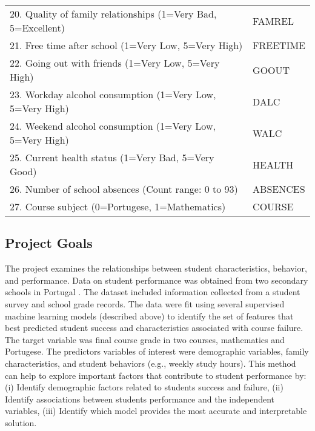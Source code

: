 \documentclass[sigconf]{acmart}
\begin{document}
\begin{table*}[ht]
\begin{tabular}{ll}
    20. Quality of family relationships (1=Very Bad, 5=Excellent) & FAMREL  \\
    21. Free time after school (1=Very Low, 5=Very High) & FREETIME  \\
    22. Going out with friends (1=Very Low, 5=Very High) & GOOUT  \\
    23. Workday alcohol consumption (1=Very Low, 5=Very High) & DALC  \\
    24. Weekend alcohol consumption (1=Very Low, 5=Very High) & WALC  \\
    25. Current health status (1=Very Bad, 5=Very Good) & HEALTH  \\ 
    26. Number of school absences (Count range: 0 to 93) & ABSENCES  \\
    27. Course subject (0=Portugese, 1=Mathematics) & COURSE  \\
    \bottomrule
  \end{tabular}
\end{table*}


\subsection{Project Goals} 

The project examines the relationships between student characteristics,  
behavior, and performance. Data on student performance was obtained from two 
secondary schools in Portugal \cite{cortez08}. The dataset included information
collected from a student survey and school grade records. The data were fit
using several supervised machine learning models (described above) to identify 
the set of features that best predicted student success and characteristics 
associated with course failure. The target variable was final course grade in 
two courses, mathematics and Portugese. The predictors variables of interest 
were demographic variables, family characteristics, and student behaviors 
(e.g., weekly study hours). This method can help to explore important factors 
that contribute to student performance by: (i) Identify demographic factors 
related to students success and failure, (ii) Identify associations between 
students performance and the independent variables, (iii) Identify which model
provides the most accurate and interpretable solution. 

\end{document}
